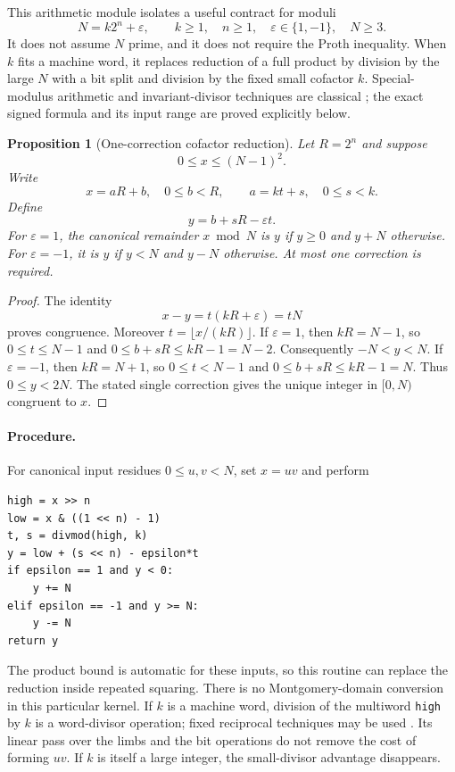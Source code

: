 \documentclass[11pt,a4paper]{article}
\newtheorem{proposition}[theorem]{Proposition}
\theoremstyle{definition}\newtheorem{definition}[theorem]{Definition}
\theoremstyle{remark}\newtheorem{remark}[theorem]{Remark}
\begin{document}
This arithmetic module isolates a useful contract for moduli
\[
 N=k2^n+\varepsilon,\qquad k\ge1,\quad n\ge1,\quad
 \varepsilon\in\{1,-1\},\quad N\ge3.
\]
It does not assume $N$ prime, and it does not require the Proth inequality.
When $k$ fits a machine word, it replaces reduction of a full product by
division by the large $N$ with a bit split and division by the fixed small
cofactor $k$. Special-modulus arithmetic and invariant-divisor techniques
are classical \cite{arith-gm}; the exact signed formula and its input range
are proved explicitly below.

\begin{proposition}[One-correction cofactor reduction]\label{prop:A10}
Let $R=2^n$ and suppose
\[
 0\le x\le(N-1)^2.
\]
Write
\[
 x=aR+b,\quad 0\le b<R,\qquad
 a=kt+s,\quad 0\le s<k.
\]
Define
\begin{equation}\label{eq:A10-reduce}
 y=b+sR-\varepsilon t.
\end{equation}
For $\varepsilon=1$, the canonical remainder $x\bmod N$ is $y$ if
$y\ge0$ and $y+N$ otherwise. For $\varepsilon=-1$, it is $y$ if $y<N$
and $y-N$ otherwise. At most one correction is required.
\end{proposition}
\begin{proof}
The identity
\[
 x-y=t(kR+\varepsilon)=tN
\]
proves congruence. Moreover $t=\lfloor x/(kR)\rfloor$.
If $\varepsilon=1$, then $kR=N-1$, so $0\le t\le N-1$ and
$0\le b+sR\le kR-1=N-2$. Consequently $-N<y<N$.
If $\varepsilon=-1$, then $kR=N+1$, so
$0\le t<N-1$ and $0\le b+sR\le kR-1=N$.
Thus $0\le y<2N$. The stated single correction gives the unique integer
in $[0,N)$ congruent to $x$.
\end{proof}

\paragraph{Procedure.}
For canonical input residues $0\le u,v<N$, set $x=uv$ and perform
\begin{lstlisting}
high = x >> n
low = x & ((1 << n) - 1)
t, s = divmod(high, k)
y = low + (s << n) - epsilon*t
if epsilon == 1 and y < 0:
    y += N
elif epsilon == -1 and y >= N:
    y -= N
return y
\end{lstlisting}
The product bound is automatic for these inputs, so this routine can replace
the reduction inside repeated squaring. There is no Montgomery-domain
conversion in this particular kernel. If $k$ is a machine word, division
of the multiword \texttt{high} by $k$ is a word-divisor operation; fixed
reciprocal techniques may be used \cite{arith-gm}. Its linear pass over the
limbs and the bit operations do not remove the cost of forming $uv$.
If $k$ is itself a large integer, the small-divisor advantage disappears.
\end{document}
